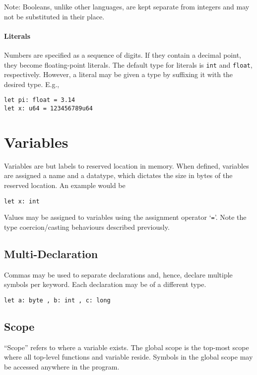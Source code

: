 \documentclass{article}
\begin{document}
Note: Booleans, unlike other languages, are kept separate from integers and may not be substituted in their place.

\paragraph*{Literals}
Numbers are specified as a sequence of digits.
If they contain a decimal point, they become floating-point literals.
The default type for literals is \texttt{int} and \texttt{float}, respectively.
However, a literal may be given a type by suffixing it with the desired type.
E.g.,
\begin{lstlisting}[language=CustomLang]
let pi: float = 3.14
let x: u64 = 123456789u64
\end{lstlisting}

\section{Variables}

Variables are but labels to reserved location in memory.
When defined, variables are assigned a name and a datatype, which dictates the size in bytes of the reserved location.
An example would be

\begin{lstlisting}[language=CustomLang]
let x: int
\end{lstlisting}

Values may be assigned to variables using the assignment operator `\texttt{=}'.
Note the type coercion/casting behaviours described previously.

\subsection{Multi-Declaration}

Commas may be used to separate declarations and, hence, declare multiple symbols per keyword.
Each declaration may be of a different type.

\begin{lstlisting}[language=CustomLang]
let a: byte , b: int , c: long
\end{lstlisting}

\subsection{Scope}

``Scope'' refers to where a variable exists.
The global scope is the top-most scope where all top-level functions and variable reside.
Symbols in the global scope may be accessed anywhere in the program.
\end{document}
